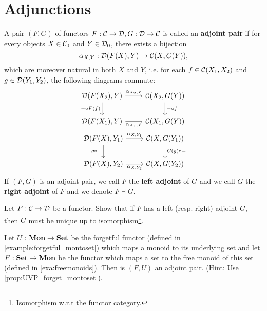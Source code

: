 \section{Adjunctions}
\label{sec:adjunctions}

\begin{dfn} A pair $(F,G)$ of functors $F : \mathcal{C}\to\mathcal{D}, G:\mathcal{D}\to\mathcal{C}$ is called an \textbf{adjoint pair} if for every objects $X\in{\mathcal{C}}_0$ and $Y\in{\mathcal{D}}_0$, there exists a bijection 
\[
\alpha_{X,Y} : {\mathcal{D}}(F(X),Y) \to {\mathcal{C}}(X,G(Y)),
\]
which are moreover natural in both $X$ and $Y$, i.e. for each $f\in{\mathcal{C}}(X_1,X_2)$ and $g\in{\mathcal{D}}(Y_1,Y_2)$, the following diagrams commute:
\begin{eqnarray}
\begin{tikzcd}
\CHom{\DD}{F(X_2)}{Y} \arrow[r, "\alpha_{X_2,Y}"] \arrow[d,swap, "\co{F(f)}{-}"] & \CHom{\CC}{X_2}{G(Y)} \arrow[d, "\co{f}{-}"] \\
\CHom{\DD}{F(X_1)}{Y} \arrow[r,swap, "\alpha_{X_1,Y}"] & \CHom{\CC}{X_1}{G(Y)}
\end{tikzcd}\\
\begin{tikzcd}
\CHom{\DD}{F(X)}{Y_1} \arrow[r, "\alpha_{X,Y_1}"] \arrow[d,swap, "\co{-}{g}"] & \CHom{\CC}{X}{G(Y_1)} \arrow[d, "\co{-}{G(g)}"] \\
\CHom{\DD}{F(X)}{Y_2} \arrow[r,swap, "\alpha_{X,Y_2}"] & \CHom{\CC}{X}{G(Y_2)}
\end{tikzcd}
\end{eqnarray}
If $(F,G)$ is an adjoint pair, we call $F$ the \textbf{left adjoint} of $G$ and we call $G$ the \textbf{right adjoint} of $F$ and we denote $F \dashv G$.
\end{dfn}

\begin{exer} Let $F:\mathcal{C}\to\mathcal{D}$ be a functor. Show that if $F$ has a left (resp. right) adjoint $G$, then $G$ must be unique up to isomorphism\footnote{Isomorphism w.r.t the functor category.}.
\end{exer}

\begin{exer} Let $U:\mathbf{Mon}\to \mathbf{Set}$ be the forgetful functor (defined in \cref{example:forgetful_montoset}) which maps a monoid to its underlying set and let $F : \mathbf{Set}\to\mathbf{Mon}$ be the functor which maps a set to the free monoid of this set (defined in \cref{exa:freemonoids}). Then is $(F,U)$ an adjoint pair. (Hint: Use \cref{prop:UVP_forget_montoset}). 
\end{exer}

